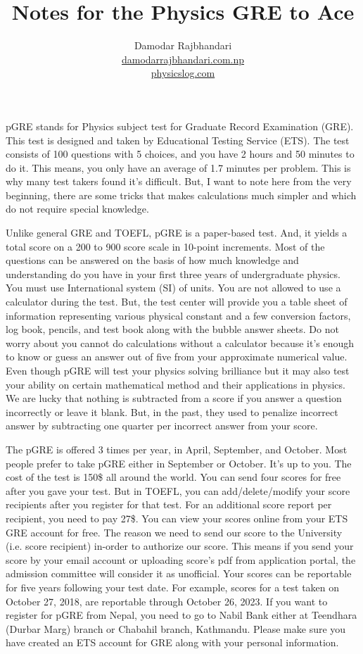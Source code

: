 \documentclass[12pt,a4paper]{article}
\title{Notes for the Physics GRE to Ace} %
\author{Damodar Rajbhandari\\ \href{https://damodarrajbhandari.com.np}{damodarrajbhandari.com.np} \\ \href{https://www.physicslog.com}{physicslog.com}} %
\begin{document}
\maketitle %

pGRE stands for Physics subject test for Graduate Record Examination (GRE). This test is designed and taken by Educational Testing Service (ETS). The test consists of 100 questions with 5 choices, and you have 2 hours and 50 minutes to do it. This means, you only have an average of 1.7 minutes per problem. This is why many test takers found it's difficult. But, I want to note here from the very beginning, there are some tricks that makes calculations much simpler and which do not require special knowledge. 

Unlike general GRE and TOEFL, pGRE is a paper-based test. And, it yields a total score on a 200 to 900 score scale in 10-point increments. Most of the questions can be answered on the basis of how much knowledge and understanding  do you have in your first three years of undergraduate physics. You must use International system (SI) of units. You are not allowed to use a calculator during the test. But, the test center will provide you a table sheet of information representing various physical constant and a few conversion factors, log book, pencils, and test book along with the bubble answer sheets. Do not worry about you cannot do calculations without a calculator because it's enough to know or guess an answer out of five from your approximate numerical value. Even though pGRE will test your physics solving brilliance but it may also test your ability on certain mathematical method and their applications in physics.  We are lucky that nothing is subtracted from a score if you answer a question incorrectly or leave it blank. But, in the past, they used to penalize incorrect answer by subtracting one quarter per incorrect answer from your score.

The pGRE is offered 3 times per year, in April, September, and October. Most people prefer to take pGRE either in September or October. It's up to you. The cost of the test is 150\$ all around the world. You can send four scores for free after you gave your test. But in TOEFL, you can add/delete/modify your score recipients after you register for that test. For an additional score report per recipient, you need to pay 27\$. You can view your scores online from your ETS GRE account for free. The reason we need to send our score to the University (i.e. score recipient) in-order to authorize our score. This means if you send your score by your email account or uploading score's pdf from application portal, the admission committee will consider it as unofficial. Your scores can be reportable for five years following your test date. For example, scores for a test taken on October 27, 2018, are reportable through October 26, 2023. If you want to register for pGRE from Nepal, you need to go to Nabil Bank either at Teendhara (Durbar Marg) branch or Chabahil branch, Kathmandu. Please make sure you have created an ETS account for GRE along with your personal information.
\end{document}

